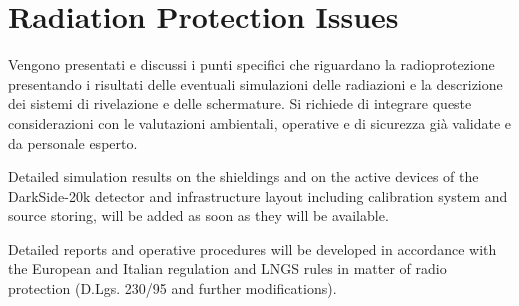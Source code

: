 \section{Radiation Protection Issues}
\label{sec:RadioProtection}

{\bf\color{red}

Vengono presentati e discussi i punti specifici che riguardano la radioprotezione presentando i risultati delle eventuali simulazioni delle radiazioni e la descrizione dei sistemi di rivelazione e delle schermature. Si richiede di integrare queste considerazioni con le valutazioni ambientali, operative e di sicurezza gi\`a validate e da personale esperto.
}

Detailed simulation results on the shieldings and on the active devices of the DarkSide-20k detector and infrastructure layout including calibration system and source storing, will be added as soon as they will be available.

Detailed reports and operative procedures will be developed in accordance with the European and Italian regulation and LNGS rules in matter of radio protection (D.Lgs. 230/95 and further modifications).

